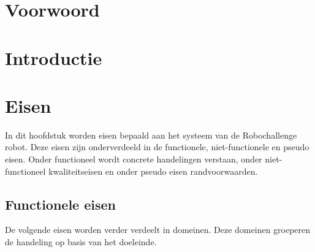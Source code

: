 \documentclass[12pt]{article} %
\begin{document}
\clearpage
\section*{Voorwoord}
\lipsum[0-2]
\newpage
\tableofcontents
\newpage
{}
\clearpage
\section{Introductie}
\label{sec:introduction}
\lipsum[0-3]
\newpage
\section{Eisen}
\label{sec:functionalities}
In dit hoofdstuk worden eisen bepaald aan het systeem van de Robochallenge robot. Deze eisen zijn onderverdeeld in de functionele, niet-functionele  en pseudo eisen. Onder functioneel wordt concrete handelingen verstaan, onder niet-functioneel kwaliteitseisen en onder pseudo eisen randvoorwaarden. 
\subsection{Functionele eisen}
De volgende eisen worden verder verdeelt in domeinen. Deze domeinen groeperen de handeling op basis van het doeleinde.
\end{document}
